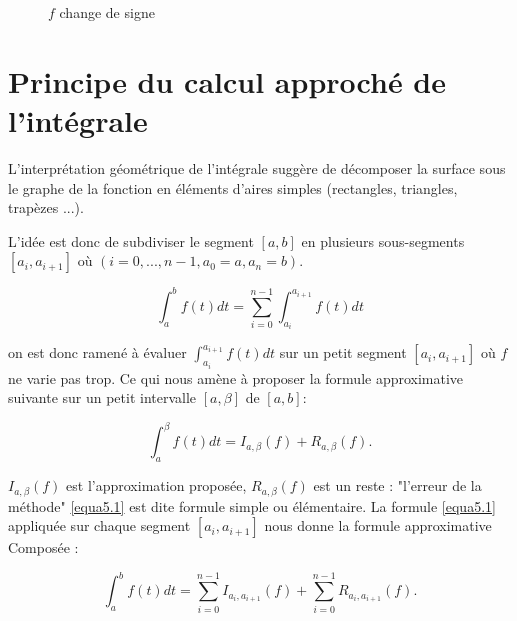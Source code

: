 \begin{figure}[H]
	\centering
	\caption{\( f \) change de signe}
	\label{fig5.2}
\end{figure}

\section{Principe du calcul approché de l'intégrale}
L'interprétation géométrique de l'intégrale suggère de décomposer la surface sous le graphe de la fonction en éléments d'aires simples (rectangles, triangles, trapèzes ...).

L'idée est donc de subdiviser le segment \([a,b]\) en plusieurs sous-segments \([a_i,a_{i+1}]\) où \((i = 0,...,n-1, a_0 = a, a_n = b)\).

\[
\displaystyle\int_a^b f(t)dt = \displaystyle\sum_{i=0}^{n-1} \displaystyle\int_{a_i}^{a_{i+1}} f(t)dt
\]

on est donc ramené à évaluer \(\displaystyle\int_{a_i}^{a_{i+1}} f(t)dt\) sur un petit segment \([a_i,a_{i+1}]\) où \(f\) ne varie pas trop. Ce qui nous amène à proposer la formule approximative suivante sur un petit intervalle \([a,\beta]\) de \([a,b]\):

\begin{equation}\label{equa5.1}
\displaystyle\int_a^\beta f(t)dt = I_{a,\beta}(f) + R_{a,\beta}(f).
\end{equation}

\(I_{a,\beta}(f)\) est l'approximation proposée, \(R_{a,\beta}(f)\) est un reste : "l'erreur de la méthode" \eqref{equa5.1} est dite formule simple ou élémentaire. La formule \eqref{equa5.1} appliquée sur chaque segment \([a_i,a_{i+1}]\) nous donne la formule approximative Composée :

\[
\displaystyle\int_a^b f(t)dt = \displaystyle\sum_{i=0}^{n-1} I_{a_i,a_{i+1}}(f) + \displaystyle\sum_{i=0}^{n-1} R_{a_i,a_{i+1}}(f).
\]

